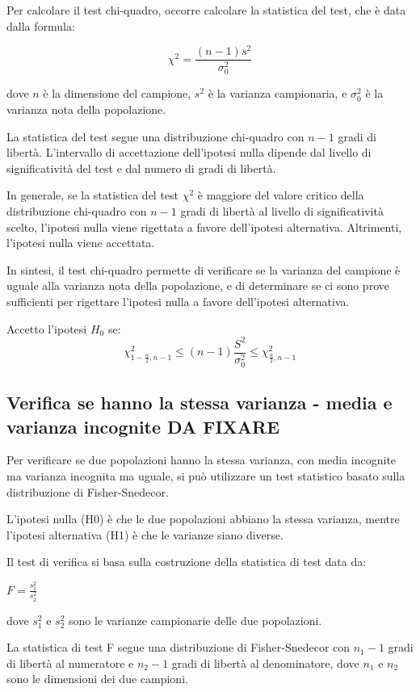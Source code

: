 Per calcolare il test chi-quadro, occorre calcolare la statistica del test, che è data dalla formula:

$$
\chi^2 = \frac{(n-1)s^2}{\sigma_0^2}
$$

dove $n$ è la dimensione del campione, $s^2$ è la varianza campionaria, e $\sigma_0^2$ è la varianza nota della popolazione.

La statistica del test segue una distribuzione chi-quadro con $n-1$ gradi di libertà. L'intervallo di accettazione dell'ipotesi nulla dipende dal livello di significatività del test e dal numero di gradi di libertà.

In generale, se la statistica del test $\chi^2$ è maggiore del valore critico della distribuzione chi-quadro con $n-1$ gradi di libertà al livello di significatività scelto, l'ipotesi nulla viene rigettata a favore dell'ipotesi alternativa. Altrimenti, l'ipotesi nulla viene accettata.

In sintesi, il test chi-quadro permette di verificare se la varianza del campione è uguale alla varianza nota della popolazione, e di determinare se ci sono prove sufficienti per rigettare l'ipotesi nulla a favore dell'ipotesi alternativa.

Accetto l'ipotesi $H_0$ se:
\begin{equation}
  \chi^2_{1-\frac{\alpha}{2}, n-1} \leq (n-1)\frac{S^2}{\sigma_0^2} \leq \chi^2_{\frac{\alpha}{2}, n-1}
\end{equation}

\subsection{Verifica se hanno la stessa varianza - media e varianza incognite DA FIXARE}
Per verificare se due popolazioni hanno la stessa varianza, con media incognite ma varianza incognita ma uguale, si può utilizzare un test statistico basato sulla distribuzione di Fisher-Snedecor. 

L'ipotesi nulla (H0) è che le due popolazioni abbiano la stessa varianza, mentre l'ipotesi alternativa (H1) è che le varianze siano diverse.

Il test di verifica si basa sulla costruzione della statistica di test data da:

$F = \frac{s_1^2}{s_2^2}$

dove $s_1^2$ e $s_2^2$ sono le varianze campionarie delle due popolazioni.

La statistica di test F segue una distribuzione di Fisher-Snedecor con $n_1-1$ gradi di libertà al numeratore e $n_2-1$ gradi di libertà al denominatore, dove $n_1$ e $n_2$ sono le dimensioni dei due campioni.

